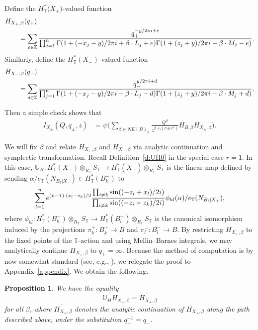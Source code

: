 \documentclass[11pt]{article}
\numberwithin{equation}{section}
\newtheorem{Proposition}[Theorem]{Proposition}
 { \theoremstyle{definition}
\newtheorem{Definition}[Theorem]{Definition}
\newtheorem{Note}[Theorem]{Note}
\newtheorem{Example}[Theorem]{Example}
\newtheorem{Remark}[Theorem]{Remark} }
\numberwithin{equation}{section}
\newcommand{\ZZ}{\mathbb{Z}}
\newcommand{\UU}{\mathbb{U}}
\newcommand{\torus}{\mathbb{T}}
\newcommand{\F}{F}
\newcommand{\E}{E}
\newcommand{\MB}{M}
\newcommand{\LB}{L}
\newcommand{\z}{z}
\newcommand{\x}{x}
\newcommand{\y}{y}
\begin{document}
Define the $H^*_\torus\bigl(X_+\bigr)$-valued function
\begin{align*}&H_{X_{+}, \beta}(q_+)\\ \nonumber
&\qquad{}= \sum_{e \in \ZZ} \frac{q_+^{-y/2 \pi {\rm i}+e}}
{\prod_{j=1}^n \Gamma(1 + (- \x_j - \y)/2 \pi {\rm i} + \beta \cdot \LB_j+e) \Gamma(1 + (\z_j + \y)/2 \pi {\rm i} - \beta \cdot \MB_j - e)}.\end{align*}
Similarly, define the $H^*_\torus(X_-)$-valued function
\begin{align}\label{e:HXm} &H_{X_-, \beta}(q_-) \\ \nonumber
& \qquad{}= \sum_{d \in \ZZ} \frac{q_-^{y/2 \pi {\rm i}+d}}
{\prod_{j=1}^n \Gamma(1 + (- \x_j - \y)/2 \pi {\rm i} + \beta \cdot \LB_j-d) \Gamma(1 + (\z_j + \y)/2 \pi {\rm i} - \beta \cdot \MB_j + d)}.\end{align}

Then a simple check shows that
\begin{align}\label{ItoH} I_{X_\pm}(Q, q_\pm, z) &{}= \psi \biggl( \sum_{\beta \in NE(B)_\ZZ} \frac{Q^\beta}{z^{\beta \cdot c_1(\E \oplus \F^\vee)}} H_{B, \beta} H_{X_\pm, \beta} \biggr).
\end{align}



We will fix $\beta$ and relate $H_{X_+, \beta}$ and $H_{X_-, \beta}$ via analytic continuation and symplectic transformation.
Recall Definition~\ref{d:UH0} in the special case $r=1$. In this case, $\UU_H\colon H^*_\torus(X_{-}) \otimes_{R_\torus} S_\torus \to H^*_\torus(X_{+})\otimes_{R_\torus} S_\torus$ is the linear map defined
by sending
$\alpha/e_\torus(N_{B_k|X_-}) \in H^*_\torus(B_k^{-})$ to
\begin{equation}\label{eU1}
\sum_{l = 1}^n {\rm e}^{ (n-1)\cdot ( \x_l-\z_k)/2 }\frac{ \prod_{i\neq k} \sin( (-\z_i+\x_l)/2 {\rm i}) }{\prod_{i \neq k}\sin((-\z_i + \z_k)/2 {\rm i})} \phi_{kl}(\alpha)/e_\torus(N_{B_l|X_+}),\end{equation}
where $\phi_{kl}\colon H^*_\torus(B_k^{-})\otimes_{R_\torus} S_\torus \to H^*_\torus(B_l^{+})\otimes_{R_\torus} S_\torus$ is the canonical isomorphism induced by the projections $\pi_k^{+}\colon B_k^{+} \to B$ and $\pi_l^{-}\colon B_l^{-} \to B$.
By restricting $H_{X_+, \beta}$ to the fixed points of the $\torus$-action and
using Mellin--Barnes integrals, we may analytically continue $H_{X_+, \beta}$ to $q_+ = \infty.$ Because the method of computation is by now somewhat standard (see, e.g., \cite{CIJ}), we relegate the proof to Appendix~\ref{appendix}.
We obtain the following.
\begin{Proposition}\label{p:ac1}
We have the equality
 \begin{equation}\label{analyticcomp}
\UU_H H_{X_{-}, \beta} = \widetilde{H_{X_{+}, \beta}}
\end{equation}
for all $\beta$, where $\widetilde{H_{X_{+}, \beta}}$ denotes the analytic continuation of $H_{X_{+}, \beta}$ along the path described above, under the substitution $q_+^{-1} = q_-$.
\end{Proposition}
\end{document}
